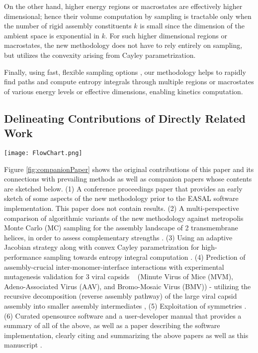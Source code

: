 \documentclass[]{article}
\begin{document}
On the other hand, higher energy regions or macrostates are effectively higher
dimensional; hence their volume computation by sampling is tractable only when
the number of rigid assembly constituents $k$ is small since the dimension of
the ambient space is exponential in $k$. For such higher dimensional regions or
macrostates, the new methodology does not have to rely entirely on sampling,
but utilizes the convexity arising from Cayley parametrization.

Finally, using fast, flexible sampling options \cite{Ozkan2014Jacobian}, our
methodology helps to rapidly find paths and compute entropy integrals through
multiple regions or macrostates of various energy levels or effective
dimensions, enabling kinetics computation.

\subsection{Delineating Contributions of Directly Related Work}
\label{sec:app:companionPapers}
\begin{figure*}
\texttt{[image: FlowChart.png]}
\caption{\scriptsize Delineating contributions of directly related work.}
\label{fig:companionPaper}
\end{figure*}

Figure \ref{fig:companionPaper} shows the original contributions of this paper
and its connections with prevailing methods as well as companion papers whose
contents are sketched below. (1) A conference proceedings paper that provides
an early sketch of some aspects of the new methodology prior to the EASAL
software implementation. This paper does not contain results. (2) A
multi-perspective comparison of algorithmic variants of the new methodology
against metropolis Monte Carlo (MC) sampling for the assembly landscape of 2
transmembrane helices, in order to assess complementary strengths
\cite{Ozkan2014MC}. (3) Using an adaptive Jacobian strategy along with convex
Cayley parametrization for high-performance sampling towards entropy integral
computation \cite{Ozkan2014Jacobian}. (4) Prediction of assembly-crucial
inter-monomer-interface interactions with experimental mutagenesis validation
for 3 viral capsids ~\cite{Wu2012, virus2019} (Minute Virus of Mice (MVM),
Adeno-Associated Virus (AAV), and Bromo-Mosaic Virus (BMV)) - utilizing the
recursive decomposition (reverse assembly pathway) of the large viral capsid
assembly into smaller assembly intermediates \cite{sitharam:Assembly, mvs2006},
(5) Exploitation of symmetries \cite{sym8010005}. (6) Curated opensource
software and a user-developer manual that provides a summary of all of the
above, as well as a paper describing the software implementation, clearly
citing and summarizing the above papers as well as this manuscript
\cite{Ozkan:toms}.
\end{document}
